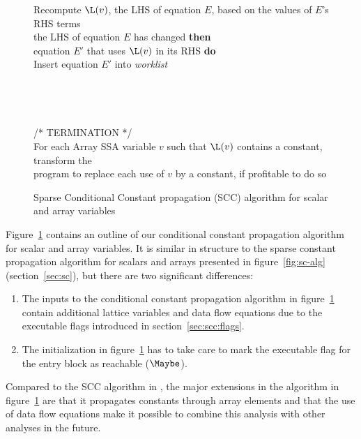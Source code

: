 \begin{figure}
\begin{center}
\begin{programa}
\Tb Recompute $\L(v)$, the LHS of equation $E$, based on the values of $E$'s RHS terms\\
 the LHS of equation $E$ has changed {\bf then}\\
 equation $E'$ that uses $\L(v)$ in its RHS {\bf do}\\
\Td Insert equation $E'$ into {\it worklist}\\
\\
\\
 \\
\\
/* TERMINATION */\\
\Ta For each Array SSA variable $v$ such that $\L(v)$ contains a constant, transform the \\ 
\Ta program to replace each use of $v$ by a constant, if profitable to do so
\end{programa}
\end{center}
\caption{Sparse Conditional Constant propagation (SCC) algorithm for scalar and array variables}
\label{fig:scc-alg}
\end{figure}

Figure~\ref{fig:scc-alg} contains an outline of our conditional constant
propagation algorithm for scalar and array variables.  It is similar in
structure to the sparse constant propagation algorithm for scalars
and arrays presented in figure~\ref{fig:sc-alg} (section~\ref{sec:sc}),
but there are two significant differences:
\begin{enumerate}
\item The inputs to the conditional constant propagation algorithm
in figure~\ref{fig:scc-alg}
contain additional lattice variables and data flow equations due
to the executable flags introduced in section~\ref{sec:scc:flags}.
\item The initialization in figure~\ref{fig:scc-alg}
has to take care to mark the executable flag for the entry 
block as reachable ($\Maybe$).
\end{enumerate}
Compared to the SCC algorithm in \cite{WeZa91}, the major extensions in
the algorithm in figure~\ref{fig:scc-alg} are that it propagates constants
through array elements and that the use of data flow equations make
it possible to combine this analysis with other analyses in the future.


